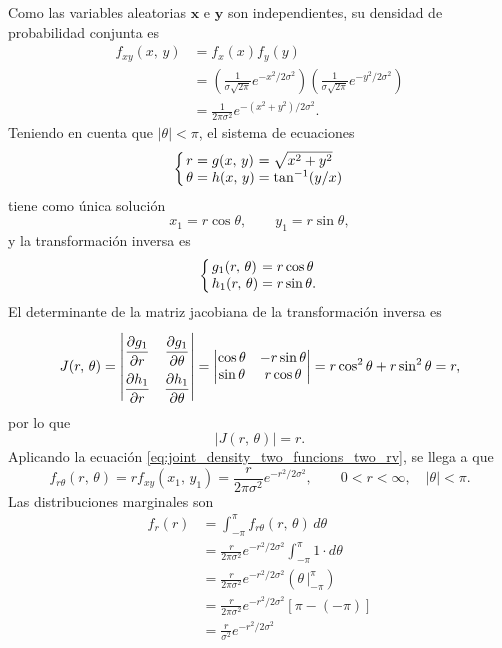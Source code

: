 \documentclass[a4paper]{report}
\newcommand{\x}{\mathbf{x}}
\newcommand{\y}{\mathbf{y}}
\begin{document}
Como las variables aleatorias \(\x\) e \(\y\) son independientes, su densidad de probabilidad conjunta es
\begin{align*}
 f_{xy}(x,\,y)&=f_x(x)f_y(y)\\
   &=\left(\frac{1}{\sigma\sqrt{2\pi}}e^{-x^2/2\sigma^2}\right)\left(\frac{1}{\sigma\sqrt{2\pi}}e^{-y^2/2\sigma^2}\right)\\
   &=\frac{1}{2\pi\sigma^2}e^{-(x^2+y^2)/2\sigma^2}.
\end{align*}
Teniendo en cuenta que \(|\theta|<\pi\), el sistema de ecuaciones
\begin{equation}\label{eq:magnitude_and_phase_rv_transformation}
 \arraycolsep=1.4pt
 \left\{
 \begin{array}{lllll}
  r&=&g(x,\,y)&=&\sqrt{x^2+y^2}\\
  \theta&=&h(x,\,y)&=&\tan^{-1}(y/x)
 \end{array} \right.
\end{equation}
tiene como única solución
\[
 x_1=r\cos\theta,\qquad y_1=r\sin\theta,
\]
y la transformación inversa es
\[
\arraycolsep=1.4pt
 \left\{
 \begin{array}{lll}
  g_1(r,\,\theta)&=&r\cos\theta\\
  h_1(r,\,\theta)&=&r\sin\theta.
 \end{array} \right.
\]
El determinante de la matriz jacobiana de la transformación inversa es
\[
\def\arraystretch{2.2}
 J(r,\,\theta)=
\begin{vmatrix}
   \dfrac{\partial g_1}{\partial r} & \dfrac{\partial g_1}{\partial \theta} \\
   \dfrac{\partial h_1}{\partial r} & \dfrac{\partial h_1}{\partial \theta}
\end{vmatrix}
=
\def\arraystretch{1}
\begin{vmatrix}
   \cos\theta & -r\sin\theta \\
   \sin\theta & r\cos\theta
\end{vmatrix}
=r\cos^2\theta+r\sin^2\theta = r,
\]
por lo que
\[
 |J(r,\,\theta)|=r.
\]
Aplicando la ecuación \ref{eq:joint_density_two_funcions_two_rv}, se llega a que
\[
 f_{r\theta}(r,\,\theta)=rf_{xy}(x_1,\,y_1)=\frac{r}{2\pi\sigma^2}e^{-r^2/2\sigma^2},\qquad0<r<\infty,\quad|\theta|<\pi.
\]
Las distribuciones marginales son
\begin{align*}
 f_r(r)&=\int_{-\pi}^{\pi}f_{r\theta}(r,\,\theta)\,d\theta\\
   &=\frac{r}{2\pi\sigma^2}e^{-r^2/2\sigma^2}\int_{-\pi}^{\pi}1\cdot d\theta\\ 
   &=\frac{r}{2\pi\sigma^2}e^{-r^2/2\sigma^2}\left(\theta\,\bigg|_{-\pi}^{\pi}\right)\\ 
   &=\frac{r}{2\pi\sigma^2}e^{-r^2/2\sigma^2}\left[\pi-(-\pi)\right]\\
   &=\frac{r}{\sigma^2}e^{-r^2/2\sigma^2}
\end{align*}
\end{document}

